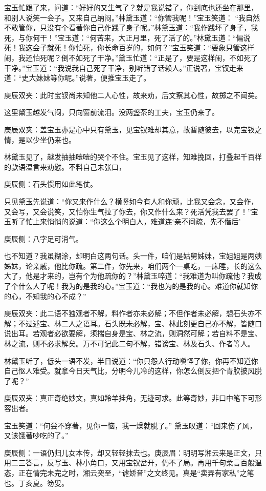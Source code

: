 \begin{parag}
    宝玉忙跟了来，问道：“好好的又生气了？就是我说错了，你到底也还坐在那里，和别人说笑一会子。又来自己纳闷。”林黛玉道：“你管我呢！”宝玉笑道： “我自然不敢管你，只没有个看著你自己作践了身子呢。”林黛玉道：“我作践坏了身子，我死，与你何干！”宝玉道：“何苦来，大正月里，死了活了的。”林黛玉道：“偏说死！我这会子就死！你怕死，你长命百岁的，如何？”宝玉笑道：“要象只管这样闹，我还怕死呢？倒不如死了干净。”黛玉忙道：“正是了，要是这样闹，不如死了干净。”宝玉道：“我说我自己死了干净，别听错了话赖人。”正说著，宝钗走来道：“史大妹妹等你呢。”说著，便推宝玉走了。\begin{note}庚辰双夹：此时宝钗尚未知他二人心性，故来劝，后文察其心性，故掷之不闻矣。\end{note}这里黛玉越发气闷，只向窗前流泪。没两盏茶的工夫，宝玉仍来了。\begin{note}庚辰双夹：盖宝玉亦是心中只有黛玉，见宝钗难却其意，故暂随彼去，以完宝钗之情，是以少坐仍来也。\end{note}林黛玉见了，越发抽抽噎噎的哭个不住。宝玉见了这样，知难挽回，打叠起千百样的款语温言来劝慰。不料自己未张口，\begin{note}庚辰侧：石头惯用如此笔仗。\end{note}只见黛玉先说道：“你又来作什么？横竖如今有人和你顽，比我又会念，又会作，又会写，又会说笑，又怕你生气拉了你去，你又作什么来？死活凭我去罢了！”宝玉听了忙上来悄悄的说道：“你这么个明白人，难道连‘亲不间疏，先不僭后’\begin{note}庚辰侧：八字足可消气。\end{note}也不知道？我虽糊涂，却明白这两句话。头一件，咱们是姑舅姊妹，宝姐姐是两姨姊妹，论亲戚，他比你疏。第二件，你先来，咱们两个一桌吃，一床睡，长的这么大了，他是才来的，岂有个为他疏你的？”林黛玉啐道：“我难道为叫你疏他？我成了个什么人了呢！我为的是我的心。”宝玉道：“我也为的是我的心。难道你就知你的心，不知我的心不成？”\begin{note}庚辰双夹：此二语不独观者不解，料作者亦未必解；不但作者未必解，想石头亦不解；不过述宝、林二人之语耳。石头既未必解，宝、林此刻更自己亦不解，皆随口说出耳。若观者必欲要解，须揣自身是宝、林之流，则洞然可解；若自料不是宝、林之流，则不必求解矣。万不可记此二句不解，错谤宝、林及石头、作者等人。\end{note}林黛玉听了，低头一语不发，半日说道：“你只怨人行动嗔怪了你，你再不知道你自己怄人难受。就拿今日天气比，分明今儿冷的这样，你怎么倒反把个青肷披风脱了呢？”\begin{note}庚辰双夹：真正奇绝妙文，真如羚羊挂角，无迹可求。此等奇妙，非口中笔下可形容出者。\end{note}宝玉笑道：“何尝不穿著，见你一恼，我一燥就脱了。” 黛玉叹道：“回来伤了风，又该饿著吵吃的了。”\begin{note}庚辰侧：一语仍归儿女本传，却又轻轻抹去也。庚辰眉：明明写湘云来是正文，只用二三答言，反写玉、林小角口，又用宝钗岔开，仍不了局。再用千句柔言百般温态，正在情完未完之时，湘云突至，“谑娇音”之文终见。真是“卖弄有家私”之笔也。丁亥夏。笏叟。\end{note}
\end{parag}


